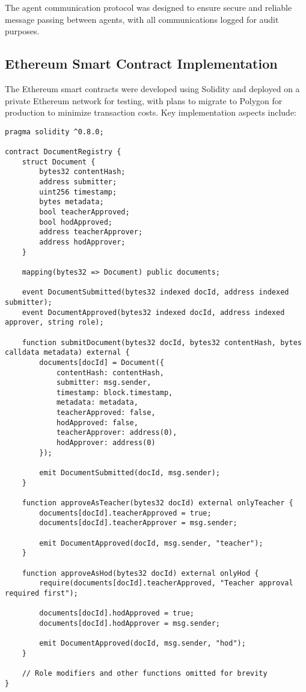 \documentclass[a4paper,12pt]{article}
\begin{document}
The agent communication protocol was designed to ensure secure and reliable message passing between agents, with all communications logged for audit purposes.

\subsection{Ethereum Smart Contract Implementation}
The Ethereum smart contracts were developed using Solidity and deployed on a private Ethereum network for testing, with plans to migrate to Polygon for production to minimize transaction costs. Key implementation aspects include:

\begin{lstlisting}[language=Solidity, caption=Document Registry Smart Contract (Simplified)]
pragma solidity ^0.8.0;

contract DocumentRegistry {
    struct Document {
        bytes32 contentHash;
        address submitter;
        uint256 timestamp;
        bytes metadata;
        bool teacherApproved;
        bool hodApproved;
        address teacherApprover;
        address hodApprover;
    }
    
    mapping(bytes32 => Document) public documents;
    
    event DocumentSubmitted(bytes32 indexed docId, address indexed submitter);
    event DocumentApproved(bytes32 indexed docId, address indexed approver, string role);
    
    function submitDocument(bytes32 docId, bytes32 contentHash, bytes calldata metadata) external {
        documents[docId] = Document({
            contentHash: contentHash,
            submitter: msg.sender,
            timestamp: block.timestamp,
            metadata: metadata,
            teacherApproved: false,
            hodApproved: false,
            teacherApprover: address(0),
            hodApprover: address(0)
        });
        
        emit DocumentSubmitted(docId, msg.sender);
    }
    
    function approveAsTeacher(bytes32 docId) external onlyTeacher {
        documents[docId].teacherApproved = true;
        documents[docId].teacherApprover = msg.sender;
        
        emit DocumentApproved(docId, msg.sender, "teacher");
    }
    
    function approveAsHod(bytes32 docId) external onlyHod {
        require(documents[docId].teacherApproved, "Teacher approval required first");
        
        documents[docId].hodApproved = true;
        documents[docId].hodApprover = msg.sender;
        
        emit DocumentApproved(docId, msg.sender, "hod");
    }
    
    // Role modifiers and other functions omitted for brevity
}
\end{lstlisting}
\end{document}
